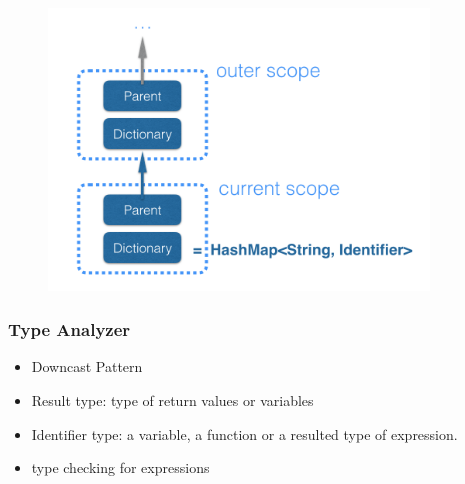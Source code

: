 \documentclass{beamer}
\begin{document}
\begin{frame}
	\begin{figure}
		\centering
		\includegraphics[width = 0.9\textwidth]{symboltable}
	\end{figure}
\end{frame}

\begin{frame} \frametitle{Type Analyzer}
	\begin{itemize}
		\item Downcast Pattern
		\item Result type: type of return values or variables
		\item Identifier type: a variable, a function or a resulted type of expression.
		\item type checking for expressions
	\end{itemize}
\end{frame}
\end{document}
